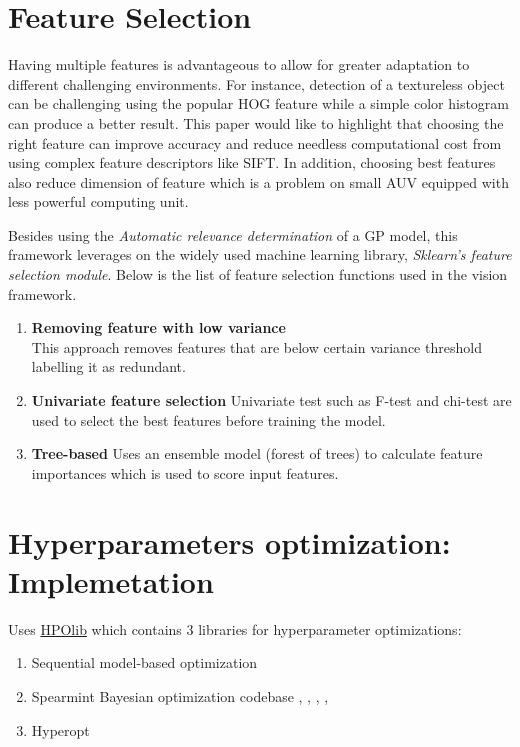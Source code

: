 \documentclass[hyp]{socreport}
\begin{document}
\section{Feature Selection}

Having multiple features is advantageous to allow for greater adaptation to
different challenging environments. For instance, detection of a textureless
object can be challenging using the popular HOG feature while a simple color
histogram can produce a better result. This paper would like to highlight that
choosing the right feature can improve accuracy and reduce needless
computational cost from using complex feature descriptors like SIFT. In
addition, choosing best features also reduce dimension of feature which is a
problem on small AUV equipped with less powerful computing unit.

Besides using the \textit{Automatic relevance determination} of a GP model, this
framework leverages on the widely used machine learning library,
\textit{Sklearn's feature selection module}. Below is the list of feature
selection functions used in the vision framework.

\begin{enumerate}

    \item \textbf{Removing feature with low variance} \\
    This approach removes features that are below certain variance threshold
    labelling it as redundant.

    \item \textbf{Univariate feature selection}
    Univariate test such as F-test and chi-test are used to select the best
    features before training the model.

    \item \textbf{Tree-based}
    Uses an ensemble model (forest of trees) to calculate feature importances
    which is used to score input features.

\end{enumerate}

\section{Hyperparameters optimization: Implemetation}

Uses \href{https://github.com/automl/HPOlib}{HPOlib} which contains 3 libraries for hyperparameter optimizations:

\begin{enumerate}
  \item Sequential model-based optimization 
  \item Spearmint Bayesian optimization codebase ,
    , ,
    , 
  \item Hyperopt
\end{enumerate}
\end{document}
